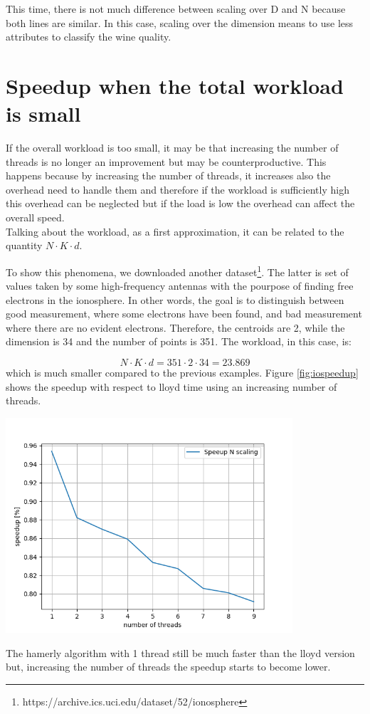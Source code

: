 \documentclass{report}
\begin{document}
\begin{minipage}[b]{0.48\textwidth}
  This time, there is not much difference between scaling over D and N because both lines are similar. In this case, scaling over the dimension means to use less attributes to classify the wine quality.

  \section*{Speedup when the total workload is small }
  If the overall workload is too small, it may be that increasing the number of threads is no longer an improvement but may be counterproductive. This happens because by increasing the number of threads, it increases also the overhead need to handle them and therefore if the workload is sufficiently high this overhead can be neglected but if the load is low the overhead can affect the overall speed.\\

  Talking about the workload, as a first approximation, it can be related to the quantity $N\cdot K\cdot d$.

  To show this phenomena, we downloaded another dataset\footnote{https://archive.ics.uci.edu/dataset/52/ionosphere}. The latter is set of values taken by some high-frequency antennas with the pourpose of finding free electrons in the ionosphere. In other words, the goal is to distinguish between good measurement, where some electrons have been found, and bad measurement where there are no evident electrons. Therefore, the centroids are 2, while the dimension is 34 and the number of points is 351. The workload, in this case, is:

  \begin{equation*}
    N\cdot K\cdot d = 351\cdot 2\cdot 34 = 23.869  
  \end{equation*}
  which is much smaller compared to the previous examples. Figure \ref{fig:iospeedup} shows the speedup with respect to lloyd time using an increasing number of threads.
  \begin{center} 
    \includegraphics[width = 0.8\textwidth]{imgs/iospeedup.png}
    \label{fig:iospeedup}
  \end{center}

  The hamerly algorithm with 1 thread still be much faster than the lloyd version but, increasing the number of threads the speedup starts to become lower.

\end{minipage}
\end{document}
